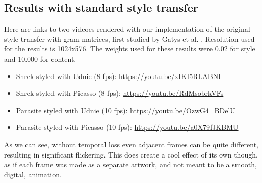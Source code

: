 \subsection{Results with standard style transfer}
Here are links to two videoes rendered with our implementation of the original style transfer with gram matrices, first studied by Gatys et al. \cite{Gatys:1}.\newline
Resolution used for the results is 1024x576. The weights used for these results were 0.02 for style and 10.000 for content. 
\begin{itemize}
\item{Shrek styled with Udnie (8 fps): \url{https://youtu.be/xIKI5RLABNI}}
\item{Shrek styled with Picasso (8 fps): \url{https://youtu.be/RdMsobrkVFs}}
\item{Parasite styled with Udnie (10 fps): \url{https://youtu.be/OzwG4_BDelU}}
\item{Parasite styled with Picasso (10 fps): \url{https://youtu.be/a0X79fJKBMU}}
\end{itemize}
As we can see, without temporal loss even adjacent frames can be quite different, resulting in significant flickering. This does create a cool effect of its own though, as if each frame was made as a separate artwork, and not meant to be a smooth, digital, animation.